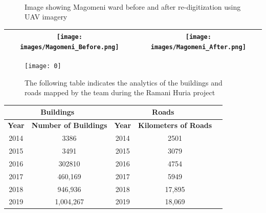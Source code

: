 \documentclass[a4paper,12pt,twoside]{article}
\begin{document}

 \begin{figure}[h]
	\caption{Image showing Magomeni ward before and after re-digitization using UAV imagery}
	\centering
	\includegraphics[width=0\textwidth]{images/Building_Footprint_Digitization.png}
\end{figure}
\begin{tabular}{|c@{}c|}
	\hline
	
	\texttt{[image: images/Magomeni\_Before.png]}&%
	\texttt{[image: images/Magomeni\_After.png]}\\
	\hline
\end{tabular}

\begin{figure}[h]
    \centering
    \texttt{[image: 0]}
    \caption{The following table indicates the analytics of the buildings and roads mapped by the team during the Ramani Huria project}
\end{figure}
\begin{center}
\begin{tabular}{|c|c|c|c|c|}
\hline
\multicolumn{2}{|c|}{\bfseries Buildings} & \multicolumn{2}{|c|}{\bfseries Roads}\\
\hline
\bfseries Year & \bfseries Number of Buildings & \bfseries Year & \bfseries Kilometers of Roads\\
\hline
2014 & 3386 & 2014 & 2501\\
\hline
2015 & 3491 & 2015 & 3079\\
\hline
2016 & 302810 & 2016 & 4754\\
\hline
2017 & 460,169 & 2017 & 5949\\
\hline
2018 & 946,936 & 2018 & 17,895\\
\hline
2019 & 1,004,267 & 2019 & 18,069\\
\hline
\end{tabular}
\end{center}


\end{document}
\end{multicols}
\end{document}
